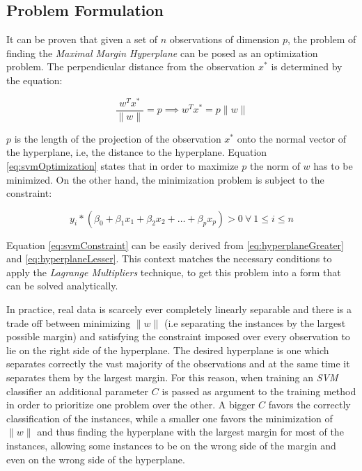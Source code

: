 \subsection{Problem Formulation}

It can be proven that given a set of $n$ observations of dimension $p$, the problem of
finding the \textit{Maximal Margin Hyperplane} can be posed as an optimization problem.
The perpendicular distance from the observation $x^{*}$ is determined by the equation:

\begin{equation}
\label{eq:svmOptimization}
\frac{w^{T}x^{*}}{\| w \|} = p \implies w^{T}x^{*} = p{\| w \|}
\end{equation}

$p$ is the length of the projection of the observation $x^{*}$
onto the normal vector of the hyperplane, i.e, the distance to the hyperplane.
Equation \ref{eq:svmOptimization} states that in order to maximize $p$ the norm of $w$
has to be minimized. On the other hand, the minimization problem is subject to the constraint:

\begin{equation}
  \label{eq:svmConstraint}
  y_{i} * (\beta_{0} + \beta_{1}x_{1} + \beta_{2}x_{2} + \dotsc + \beta_{p}x_{p}) > 0 \ \forall \ 1 \leq i \leq {n}
\end{equation}

Equation \ref{eq:svmConstraint} can be easily derived from \ref{eq:hyperplaneGreater} and
\ref{eq:hyperplaneLesser}.  This context matches the necessary conditions to apply
the \textit{Lagrange Multipliers} technique, to get this problem into a form
that can be solved analytically.

In practice, real data is scarcely ever completely linearly separable
and there is a trade off between
minimizing $\| w \|$ (i.e separating the instances by the largest possible margin)
and satisfying the constraint imposed over every
observation to lie on the right side of the hyperplane.
The desired hyperplane is one which separates correctly the vast majority of the observations and
at the same time it separates them by the largest margin. For this reason, when training an
\textit{SVM} classifier an additional parameter $C$ is passed as argument to the training
method in order to prioritize one problem over the other. A bigger $C$ favors the correctly
classification of the instances, while a smaller one favors the minimization of $\| w \|$
and thus finding the hyperplane with the largest margin for most of the instances, allowing
some instances to be on the wrong side of the margin and even on the wrong side of the
hyperplane.

